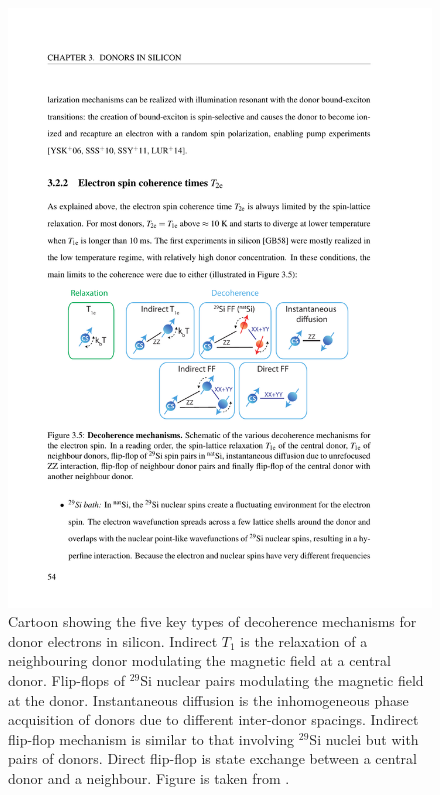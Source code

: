 \begin{figure}
\centering
\includegraphics[width = \columnwidth]{Figures/decoherenceTypes.pdf}
\caption[Decoherence mechanisms in silicon]{Cartoon showing the five key types of decoherence mechanisms for donor electrons in silicon. Indirect $T_1$ is the relaxation of a neighbouring donor modulating the magnetic field at a central donor. Flip-flops of $^{29}$Si nuclear pairs modulating the magnetic field at the donor. Instantaneous diffusion is the inhomogeneous phase acquisition of donors due to different inter-donor spacings. Indirect flip-flop mechanism is similar to that involving $^{29}$Si nuclei but with pairs of donors. Direct flip-flop is state exchange between a central donor and a neighbour. Figure is taken from \cite{Wolfowicz2015a}.}
\label{fig:decoherenceTypes}
\end{figure}




